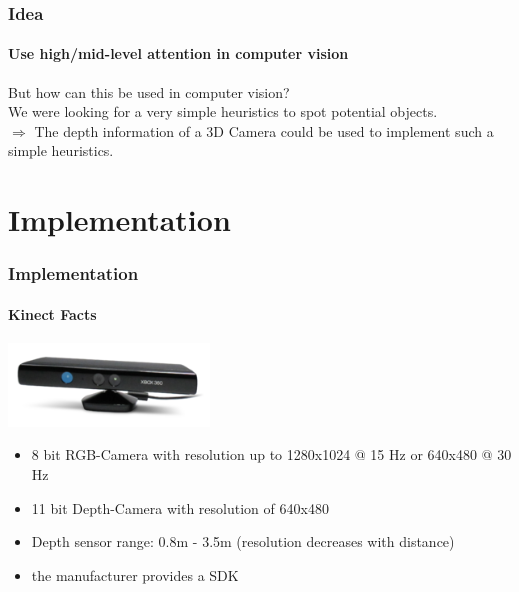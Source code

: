\documentclass[]{beamer}
\begin{document}
\begin{frame}
    \frametitle{Idea}
    \framesubtitle{Use high/mid-level attention in computer vision}
    
    But how can this be used in computer vision?\\
    \vspace{0.5cm}
    We were looking for a very simple heuristics to spot potential objects.\\
    \vspace{0.5cm}
    $\Rightarrow$ The depth information of a 3D Camera could be used to implement such a simple heuristics.
    
    
\end{frame}



\section{Implementation} %
\label{sg:sec:implementation}

\begin{frame}
    \frametitle{Implementation}
    \framesubtitle{Kinect Facts}
    
    \includegraphics[width=0.4\textwidth]{../images/kinect.png}

    \begin{itemize}
        \item<+-> 8 bit RGB-Camera with resolution up to 1280x1024 @ 15 Hz or 640x480 @ 30 Hz
        \item<+-> 11 bit Depth-Camera with resolution of 640x480
        \item<+-> Depth sensor range: 0.8m - 3.5m (resolution decreases with distance)
        \item<+-> the manufacturer provides a SDK
    \end{itemize}
\end{frame}
\end{document}
